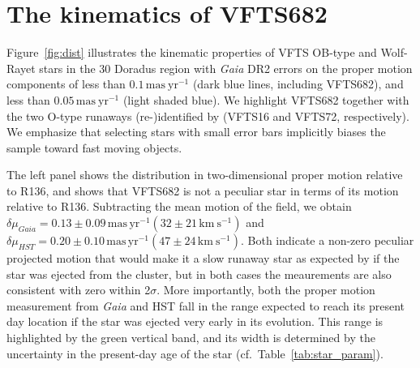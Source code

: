 \documentclass[apjl,twocolumn]{emulateapj}
\newcommand{\kms}{{\,\mathrm{km\ s^{-1}}}}
\newcommand{\masyr}{\,\mathrm{mas}\,\mathrm{yr}^{-1}}
\DeclareRobustCommand{\Tabref}[1]{Table~\ref{#1}}
\begin{document}



\section{The kinematics of VFTS682}
\label{sec:results}

Figure~\ref{fig:dist} illustrates the kinematic properties of VFTS OB-type
and Wolf-Rayet stars in the 30 Doradus region with \emph{Gaia} DR2 errors on the proper motion
components of less than $0.1\,\mathrm{mas\ yr^{-1}}$ (dark blue lines,
including VFTS682), and less than $0.05\,\mathrm{mas\ yr^{-1}}$ (light shaded
blue). We highlight VFTS682 together with the two O-type
runaways \mbox{(re-)identified} by \cite{lennon:18} (VFTS16 and VFTS72,
respectively). We emphasize that selecting stars with small error bars
implicitly biases the sample toward fast moving objects.

The left panel shows the distribution in two-dimensional proper motion relative
to R136, and shows that VFTS682 is not a peculiar star in terms of
its motion relative to R136. Subtracting the mean motion of the field,
we obtain $\delta \mu_{Gaia}=0.13\pm 0.09\masyr (32\pm 21\kms)$ and
$\delta \mu_{HST}=0.20\pm 0.10\masyr (47 \pm 24\kms )$. Both indicate
a non-zero peculiar projected motion that would make it a slow runaway
star as expected by \cite{bestenlehner:11} if the star was ejected
from the cluster,  but in both cases the meaurements are also consistent with zero within 2$\sigma$. 
More importantly, both the proper motion
measurement from \emph{Gaia} and HST fall in the range expected to
reach its present day location %
if the
star was ejected very early in its evolution. This range is
highlighted by the green vertical band, and its width is determined by
the uncertainty in the present-day age of the star (cf.~\Tabref{tab:star_param}).
\end{document}

